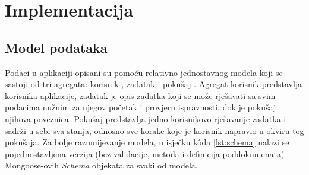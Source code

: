 \documentclass[times, utf8, diplomski, numeric]{fer}
\begin{document}






\chapter{Implementacija}


\section{Model podataka} \label{sec:data}

Podaci u aplikaciji opisani su pomoću relativno jednostavnog modela koji se sastoji od tri agregata: korisnik , zadatak  i pokušaj .
Agregat korisnik predstavlja korisnika aplikacije, zadatak je opis zadatka koji se može rješavati sa svim podacima nužnim za njegov početak i provjeru ispravnosti, dok je pokušaj njihova poveznica.
Pokušaj predstavlja jedno korisnikovo rješavanje zadatka i sadrži u sebi sva stanja, odnosno sve korake koje je korisnik napravio u okviru tog pokušaja.
Za bolje razumijevanje modela, u isječku kôda \ref{lst:schema} nalazi se pojednostavljena verzija (bez validacije, metoda i definicija poddokumenata) Mongoose-ovih \emph{Schema} objekata za svaki od modela.
\end{document}
